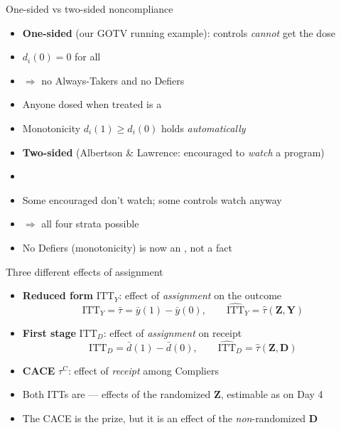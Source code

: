 \documentclass[table, xcolor = {dvipsnames}, 9pt]{beamer}
\theoremstyle{plain}
\newcommand{\mh}[1]{{\color{magenta}{#1}}}
\newcommand{\ITTY}{\mathrm{ITT}_Y}
\newcommand{\ITTD}{\mathrm{ITT}_D}
\newcommand{\hITTY}{\widehat{\mathrm{ITT}}_Y}
\newcommand{\hITTD}{\widehat{\mathrm{ITT}}_D}
\begin{document}
\begin{frame}[t]{One-sided vs two-sided noncompliance}
\vfill
\begin{itemize} \vfill
\item \textbf{One-sided} (our GOTV running example): controls \emph{cannot} get the dose \vfill
\item[] $d_i(0) = 0$ for all \vfill
\item[] $\Rightarrow$ no Always-Takers and no Defiers \mh{by construction} \vfill
\item[] Anyone dosed when treated is a \mh{Complier} \vfill
\item[] Monotonicity $d_i(1) \geq d_i(0)$ holds \emph{automatically} \vfill
\item \textbf{Two-sided} (Albertson \& Lawrence: encouraged to \emph{watch} a program) \vfill
\item[] \citep{albertsonlawrence2009} \vfill
\item[] Some encouraged don't watch; some controls watch anyway \vfill
\item[] $\Rightarrow$ all four strata possible \vfill
\item[] No Defiers (monotonicity) is now an \mh{assumption}, not a fact \vfill
\end{itemize} \vfill
\end{frame}
\begin{frame}[t]{Three different effects of assignment}
\vfill
\begin{itemize} \vfill
\item \textbf{Reduced form} $\ITTY$: effect of \emph{assignment} on the outcome \vfill
\begin{equation*}
\ITTY = \bar{\tau} = \bar{y}(1) - \bar{y}(0), \qquad \hITTY = \hat{\tau}\left(\bm{Z}, \bm{Y}\right)
\end{equation*} \vfill
\item \textbf{First stage} $\ITTD$: effect of \emph{assignment} on receipt \vfill
\begin{equation*}
\ITTD = \bar{d}(1) - \bar{d}(0), \qquad \hITTD = \hat{\tau}\left(\bm{Z}, \bm{D}\right)
\end{equation*} \vfill
\item \textbf{CACE} $\tau^{\textrm{C}}$: effect of \emph{receipt} among Compliers \vfill
\item Both ITTs are \mh{safe} --- effects of the randomized $\bm{Z}$, estimable as on Day 4 \vfill
\item The CACE is the prize, but it is an effect of the \emph{non}-randomized $\bm{D}$ \vfill
\end{itemize} \vfill
\end{frame}
\end{document}
